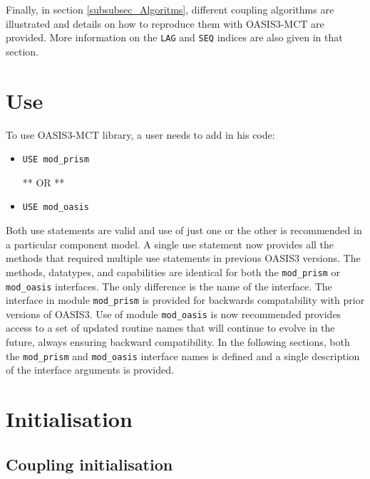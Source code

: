 Finally, in section \ref{subsubsec_Algoritms}, different coupling
algorithms are illustrated and details on how to
reproduce them with OASIS3-MCT are provided. More information on the {\tt LAG} and {\tt SEQ} indices are also given in that section.

\section{Use}
\label{subsubsec_Use}

To use OASIS3-MCT library, a user needs to add in his code: 

\begin{itemize}

\item {\tt USE mod\_prism}

 ** OR **

\item {\tt USE mod\_oasis}
 
\end{itemize}

Both use statements are valid and use of just one or the other is recommended in a particular component model. A single use statement now provides all the methods that required multiple use statements in previous OASIS3 versions.  The 
methods, datatypes, and capabilities are identical for both the {\tt mod\_prism} or {\tt mod\_oasis} interfaces.  The only difference is the name of the interface. The interface in module {\tt mod\_prism} is provided for backwards compatability with prior versions of OASIS3. Use of module {\tt mod\_oasis} is now recommended provides access to a set of updated routine names that will continue to evolve in the future, always ensuring backward compatibility.  In the following sections, both the {\tt mod\_prism} and {\tt mod\_oasis} interface names is defined and a single description of the interface arguments is provided. 

\section{Initialisation}
\label{subsubsec_Initialisation}

\subsection{Coupling initialisation}

